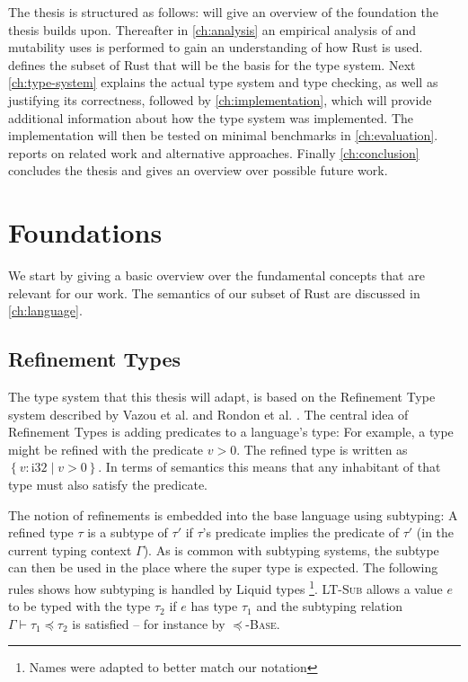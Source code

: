\documentclass[twoside, english]{sdqthesis}
\theoremstyle{definition}
\begin{document}
The thesis is structured as follows: 
 will give an overview of the foundation the thesis builds upon.
Thereafter in \cref{ch:analysis} an empirical analysis of  and mutability uses is performed to gain an understanding of how Rust is used.
 defines the subset of Rust that will be the basis for the type system.
Next \cref{ch:type-system} explains the actual type system and type checking, as well as justifying its correctness, followed by \cref{ch:implementation}, which will provide additional information about how the type system was implemented.
The implementation will then be tested on minimal benchmarks in \cref{ch:evaluation}.
 reports on related work and alternative approaches.
Finally \cref{ch:conclusion} concludes the thesis and gives an overview over possible future work.

\chapter{Foundations} \label{ch:foundations}

We start by giving a basic overview over the fundamental concepts that are relevant for our work.
The semantics of our subset of Rust are discussed in \cref{ch:language}.

\section{Refinement Types}

The type system that this thesis will adapt, is based on the Refinement Type system described by Vazou et al. \cite{vazou_abstract_2013} and Rondon et al. \cite{rondon_liquid_2008}. 
The central idea of Refinement Types is adding predicates to a language's type: For example, a type  might be refined with the predicate $v > 0$. The refined type is written as $\left\{ v : \text{i32} \mid v > 0 \right\}$. In terms of semantics this means that any inhabitant of that type must also satisfy the predicate. 

The notion of refinements is embedded into the base language using subtyping: A refined type $\tau$ is a subtype of $\tau'$ if $\tau$'s predicate implies the predicate of $\tau'$ (in the current typing context $\Gamma$).
As is common with subtyping systems, the subtype can then be used in the place where the super type is expected.
The following rules shows how subtyping is handled by Liquid types \cite[p. 6]{rondon_liquid_2008}\footnote{Names were adapted to better match our notation}. \textsc{LT-Sub} allows a value $e$ to be typed with the type $\tau_2$ if $e$ has type $\tau_1$ and the subtyping relation $\Gamma \vdash \tau_1 \preceq \tau_2$ is satisfied -- for instance by \textsc{$\preceq$-Base}. 
\end{document}
